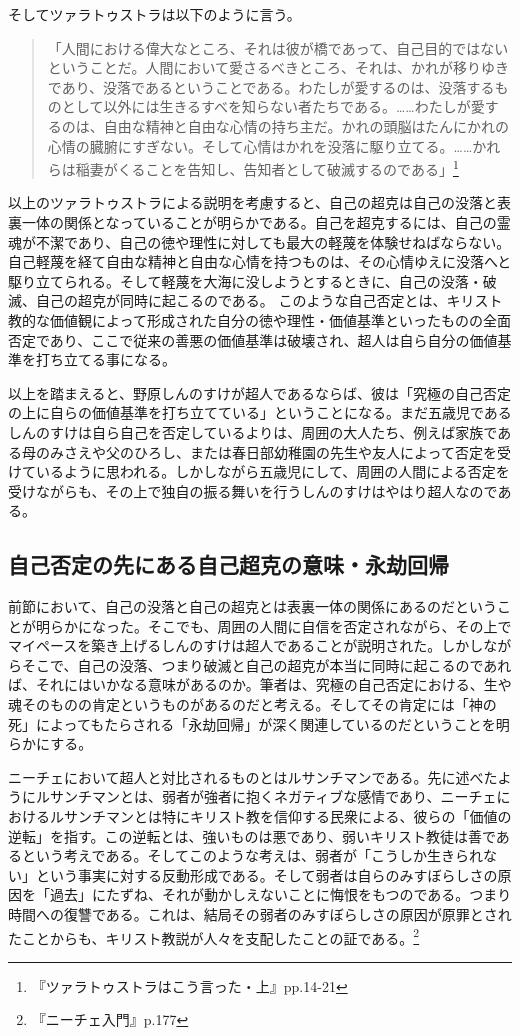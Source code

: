 \documentclass[b5j,twoside,twocolumn]{utarticle}
\begin{document}
そしてツァラトゥストラは以下のように言う。
\begin{quote}
「人間における偉大なところ、それは彼が橋であって、自己目的ではないということだ。人間において愛さるべきところ、それは、かれが移りゆきであり、没落であるということである。わたしが愛するのは、没落するものとして以外には生きるすべを知らない者たちである。……わたしが愛するのは、自由な精神と自由な心情の持ち主だ。かれの頭脳はたんにかれの心情の臓腑にすぎない。そして心情はかれを没落に駆り立てる。……かれらは稲妻がくることを告知し、告知者として破滅するのである」\footnote{『ツァラトゥストラはこう言った・上』pp.14-21}
\end{quote}


以上のツァラトゥストラによる説明を考慮すると、自己の超克は自己の没落と表裏一体の関係となっていることが明らかである。自己を超克するには、自己の霊魂が不潔であり、自己の徳や理性に対しても最大の軽蔑を体験せねばならない。自己軽蔑を経て自由な精神と自由な心情を持つものは、その心情ゆえに没落へと駆り立てられる。そして軽蔑を大海に没しようとするときに、自己の没落・破滅、自己の超克が同時に起こるのである。
このような自己否定とは、キリスト教的な価値観によって形成された自分の徳や理性・価値基準といったものの全面否定であり、ここで従来の善悪の価値基準は破壊され、超人は自ら自分の価値基準を打ち立てる事になる。


以上を踏まえると、野原しんのすけが超人であるならば、彼は「究極の自己否定の上に自らの価値基準を打ち立てている」ということになる。まだ五歳児であるしんのすけは自ら自己を否定しているよりは、周囲の大人たち、例えば家族である母のみさえや父のひろし、または春日部幼稚園の先生や友人によって否定を受けているように思われる。しかしながら五歳児にして、周囲の人間による否定を受けながらも、その上で独自の振る舞いを行うしんのすけはやはり超人なのである。

\subsection{自己否定の先にある自己超克の意味・永劫回帰}
前節において、自己の没落と自己の超克とは表裏一体の関係にあるのだということが明らかになった。そこでも、周囲の人間に自信を否定されながら、その上でマイペースを築き上げるしんのすけは超人であることが説明された。しかしながらそこで、自己の没落、つまり破滅と自己の超克が本当に同時に起こるのであれば、それにはいかなる意味があるのか。筆者は、究極の自己否定における、生や魂そのものの肯定というものがあるのだと考える。そしてその肯定には「神の死」によってもたらされる「永劫回帰」が深く関連しているのだということを明らかにする。


ニーチェにおいて超人と対比されるものとはルサンチマンである。先に述べたようにルサンチマンとは、弱者が強者に抱くネガティブな感情であり、ニーチェにおけるルサンチマンとは特にキリスト教を信仰する民衆による、彼らの「価値の逆転」を指す。この逆転とは、強いものは悪であり、弱いキリスト教徒は善であるという考えである。そしてこのような考えは、弱者が「こうしか生きられない」という事実に対する反動形成である。そして弱者は自らのみすぼらしさの原因を「過去」にたずね、それが動かしえないことに悔恨をもつのである。つまり時間への復讐である。これは、結局その弱者のみすぼらしさの原因が原罪とされたことからも、キリスト教説が人々を支配したことの証である。\footnote{『ニーチェ入門』p.177}
\end{document}
